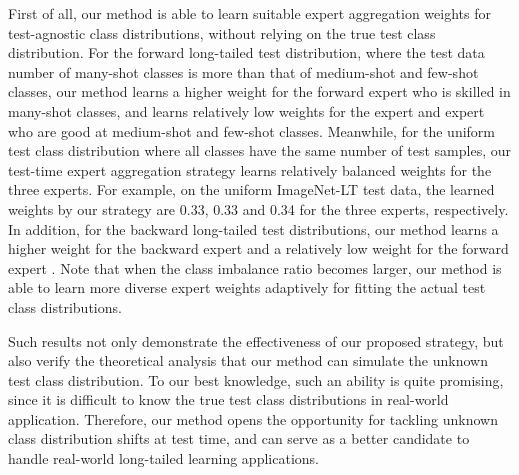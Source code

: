\documentclass{article}
\begin{document}
First of all, our method is able to learn suitable expert aggregation weights for test-agnostic    class distributions, without relying on the true test class distribution. For  the forward long-tailed test distribution, where the test data number of many-shot classes is more than that of medium-shot and few-shot classes, our method learns a higher weight for  the forward expert  who is skilled in many-shot classes, and learns relatively low weights for the expert  and expert  who are good at medium-shot and few-shot classes. 
Meanwhile, for the uniform test class distribution where all classes have the same number of test samples, our test-time expert aggregation strategy learns relatively balanced weights for the three experts. For example, on the uniform ImageNet-LT test data, the learned weights by our strategy are 0.33, 0.33 and 0.34 for the three experts, respectively. In addition, for the backward long-tailed test distributions, our method   learns a higher weight for the backward expert  and a  relatively low weight for the forward expert .
Note that when the class imbalance ratio becomes larger, our method is able to  learn more diverse expert weights adaptively for fitting  the actual   test class distributions.
 
Such results not only demonstrate the effectiveness of our proposed  strategy, but also verify the theoretical analysis that our method can simulate   the unknown test class distribution.
To our best knowledge, such an ability  is quite promising, since it is   difficult  to know the true test class distributions in real-world application. Therefore, our method opens the opportunity for tackling unknown class distribution shifts at test time, and can serve as  a better candidate to handle real-world long-tailed  learning applications.
 
\end{document}
